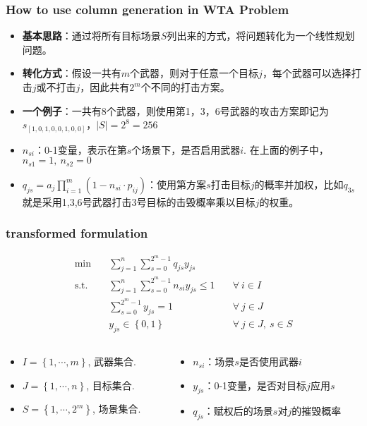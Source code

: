 \documentclass[10pt]{beamer}
\newcommand{\sumFromTo}[3]{\ensuremath{\sum_{#1}^{#2} #3}}
\newcommand{\optimalProblem}[3]
{\begin{align*}
    #1 \quad &#2 \\
    \mathrm{s. t.}\quad&#3
\end{align*}}
\begin{document}
\begin{frame}
    \frametitle{How to use column generation in WTA Problem}
    \begin{itemize}
		\item \textbf{基本思路}：通过将所有目标场景$S$列出来的方式，将问题转化为一个线性规划问题。
		\item \textbf{转化方式}：假设一共有$m$个武器，则对于任意一个目标$j$，每个武器可以选择打击$j$或不打击$j$，因此共有$2^m$个不同的打击方案。
		\item \textbf{一个例子}：一共有8个武器，则使用第1，3，6号武器的攻击方案即记为$s_{[1,0,1,0,0,1,0,0]}$，$|S| = 2^8 = 256$
		\item $n_{si}$：0-1变量，表示在第$s$个场景下，是否启用武器$i$. 在上面的例子中，$n_{s1} = 1,\ n_{s2} = 0$
		\item $q_{js} = a_j \prod_{i = 1}^m (1 - n_{si}\cdot p_{ij})$：使用第方案$s$打击目标$j$的概率并加权，比如$q_{3s}$就是采用1,3,6号武器打击$3$号目标的击毁概率乘以目标$j$的权重。
	\end{itemize}
\end{frame}

\begin{frame}
    \frametitle{transformed formulation}
    \optimalProblem{\min}{\sumFromTo{j = 1}{n}{\sumFromTo{s = 0}{2^m -1}{q_{js}y_{js}}}}{\sumFromTo{j = 1}{n}{\sumFromTo{s = 0}{2^m -1}{n_{si}y_{js}}}\leq 1 \quad &\forall ~ i \in I\\& \sumFromTo{s = 0}{2^m - 1}{y_{js}} = 1 \quad &\forall ~ j \in J\\& y_{js} \in \left\{ 0,1 \right\} &\forall ~ j\in J,\ s\in S}
    \begin{columns}
        \begin{column}{.70\linewidth}
            \footnotesize
            \begin{itemize}
                \item $I = \left\{1,\cdots,m\right\} $, 武器集合.
                \item $J = \left\{1,\cdots,n\right\} $, 目标集合.
                \item $S = \left\{1,\cdots,2^m\right\}$, 场景集合.
            \end{itemize}
        \end{column}
    \hspace{-3cm}
        \begin{column}{.70\linewidth}
            \footnotesize
            \begin{itemize}
                \item $n_{si}$：场景$s$是否使用武器$i$
                \item $y_{js}$：0-1变量，是否对目标$j$应用$s$
                \item $q_{js}$：赋权后的场景$s$对$j$的摧毁概率
            \end{itemize}
        \end{column}
    \end{columns}
\end{frame}
\end{document}
